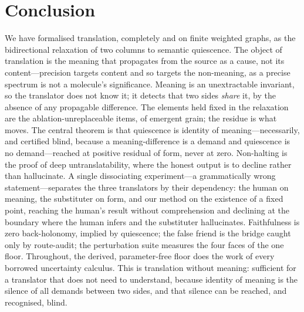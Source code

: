 \documentclass[11pt,a4paper]{article}
\theoremstyle{thmstyle}
\theoremstyle{definition}
\theoremstyle{remark}
\begin{document}
\section{Conclusion}
\label{sec:conclusion}

We have formalised translation, completely and on finite weighted graphs, as
the bidirectional relaxation of two columns to semantic quiescence. The
object of translation is the meaning that propagates from the source as a
cause, not its content---precision targets content and so targets the
non-meaning, as a precise spectrum is not a molecule's significance. Meaning
is an unextractable invariant, so the translator does not know it; it detects
that two sides \emph{share} it, by the absence of any propagable difference.
The elements held fixed in the relaxation are the ablation-unreplaceable
items, of emergent grain; the residue is what moves. The central theorem is
that quiescence is identity of meaning---necessarily, and certified blind,
because a meaning-difference is a demand and quiescence is no demand---reached
at positive residual of form, never at zero. Non-halting is the proof of deep
untranslatability, where the honest output is to decline rather than
hallucinate. A single dissociating experiment---a grammatically wrong
statement---separates the three translators by their dependency: the human on
meaning, the substituter on form, and our method on the existence of a fixed
point, reaching the human's result without comprehension and declining at the
boundary where the human infers and the substituter hallucinates. Faithfulness
is zero back-holonomy, implied by quiescence; the false friend is the bridge
caught only by route-audit; the perturbation suite measures the four faces of
the one floor. Throughout, the derived, parameter-free floor does the work of
every borrowed uncertainty calculus. This is translation without meaning:
sufficient for a translator that does not need to understand, because identity
of meaning is the silence of all demands between two sides, and that silence
can be reached, and recognised, blind.
\end{document}
